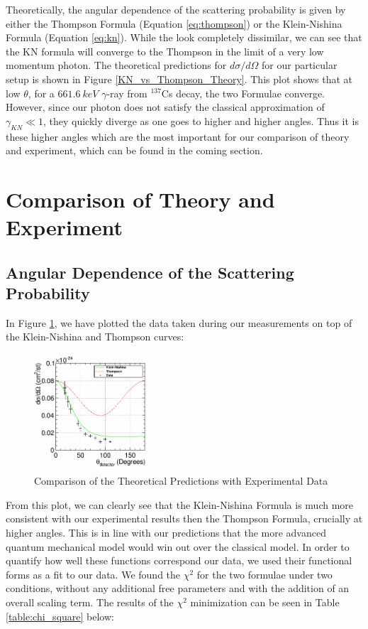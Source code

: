 \documentclass[%
 reprint,
 amsmath,amssymb,
 aps,
 pra,
]{revtex4-1}
\begin{document}
Theoretically, the angular dependence of the scattering probability is given by either the Thompson Formula (Equation \ref{eq:thompson}) or the Klein-Nishina Formula (Equation \ref{eq:kn}). While the look completely dissimilar, we can see that the KN formula will converge to the Thompson in the limit of a very low momentum photon. The theoretical predictions for $d\sigma / d\Omega$ for our particular setup is shown in Figure \ref{KN_vs_Thompson_Theory}. This plot shows that at low $\theta$, for a $661.6~keV$ $\gamma$-ray from $^{137}$Cs decay, the two Formulae converge. However, since our photon does not satisfy the classical approximation of $\gamma_{KN} \ll 1$, they quickly diverge as one goes to higher and higher angles. Thus it is these higher angles which are the most important for our comparison of theory and experiment, which can be found in the coming section.

\section{Comparison of Theory and Experiment}

\subsection{Angular Dependence of the Scattering Probability}

In Figure \ref{KN_vs_Thompson_Unscaled}, we have plotted the data taken during our measurements on top of the Klein-Nishina and Thompson curves:

\begin{figure}[H]
	\centering
	\includegraphics[width=0.4\textwidth]{KNvsThompson_Unscaled.png}
	\caption{Comparison of the Theoretical Predictions with Experimental Data}
	\label{KN_vs_Thompson_Unscaled}
\end{figure}

\noindent From this plot, we can clearly see that the Klein-Nishina Formula is much more consistent with our experimental results then the Thompson Formula, crucially at higher angles. This is in line with our predictions that the more advanced quantum mechanical model would win out over the classical model. In order to quantify how well these functions correspond our data, we used their functional forms as a fit to our data. We found the $\chi^2$ for the two formulae under two conditions, without any additional free parameters and with the addition of an overall scaling term. The results of the $\chi^2$ minimization can be seen in Table \ref{table:chi_square} below:
\end{document}
